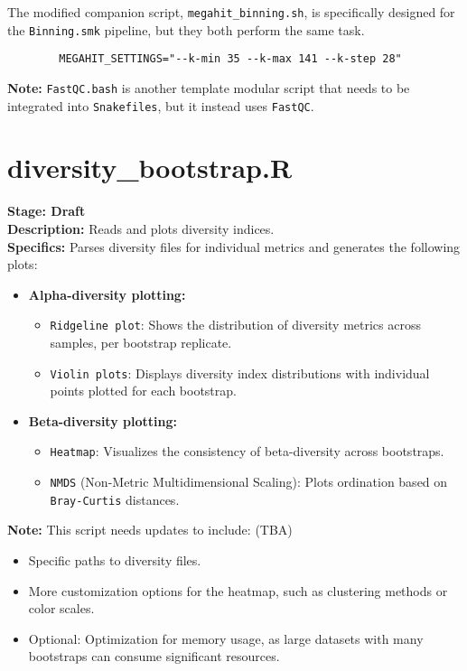 \documentclass[11pt]{report}
\begin{document}
{\begin{tcolorbox}
	The modified companion script, \texttt{megahit\_binning.sh}, is specifically designed for the \texttt{Binning.smk} pipeline, but they both perform the same task.  
	\begin{verbatim}
		MEGAHIT_SETTINGS="--k-min 35 --k-max 141 --k-step 28"
	\end{verbatim} 
	\textbf{Note:} \texttt{FastQC.bash} is another template modular script that needs to be integrated into \texttt{Snakefiles}, but it instead uses \texttt{FastQC}.
\end{tcolorbox}

\linenumbers*
\section{diversity\_bootstrap.R} 
\textbf{Stage: Draft} \\   
\textbf{Description:} Reads and plots diversity indices. \\
\textbf{Specifics:} Parses diversity files for individual metrics and generates the following plots:
\begin{itemize}
	\item \textbf{Alpha-diversity plotting:}
	\begin{itemize}
		\item \texttt{Ridgeline plot}: Shows the distribution of diversity metrics across samples, per bootstrap replicate.
		\item \texttt{Violin plots}: Displays diversity index distributions with individual points plotted for each bootstrap.
	\end{itemize}
	\item \textbf{Beta-diversity plotting:}
	\begin{itemize}
		\item \texttt{Heatmap}: Visualizes the consistency of beta-diversity across bootstraps.
		\item \texttt{NMDS} (Non-Metric Multidimensional Scaling): Plots ordination based on \texttt{Bray-Curtis} distances.
	\end{itemize}
\end{itemize}
\textbf{Note:} This script needs updates to include: (TBA)
\begin{itemize}
	\item Specific paths to diversity files.
	\item More customization options for the heatmap, such as clustering methods or color scales.
	\item Optional: Optimization for memory usage, as large datasets with many bootstraps can consume significant resources.
\end{itemize}


}
\end{document}
